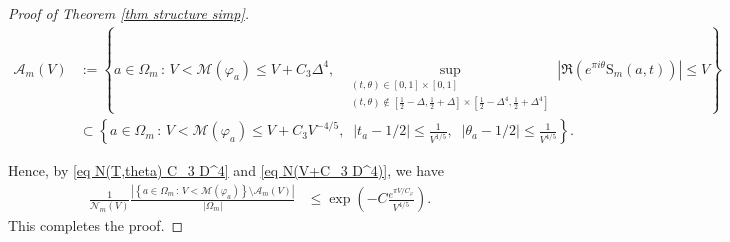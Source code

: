 \documentclass[12pt]{amsart}
\theoremstyle{definition}
\numberwithin{equation}{section}
\numberwithin{equation}{section}
\def\Ncal{\mathcal{N}}
\def\B{\mathrm{S}}
\def\M{\mathcal{M}}
\def\Mp{C_\varphi}
\begin{document}
\begin{proof}[Proof of Theorem \ref{thm structure simp}]
\begin{align*}
\mathcal{A}_m(V)&:= \left\{
a \in \Omega_m \, :\,  
V < \M(\varphi_a)\leq V + C_3\Delta^4, \;\;
\sup_{\substack{(t,\theta) \in 
[0,1]\times [0,1] 
\\
(t,\theta) \not\in 
\left[\frac{1}{2}-\Delta,\frac{1}{2}+\Delta\right]\times \left[\frac{1}{2}-\Delta^4,\frac{1}{2}+\Delta^4\right] }}
\left|\Re\left(e^{\pi i\theta}\B_m(a,t)\right)
\right|\leq V
\right\}\\
&\subset \left\{
a \in \Omega_m \, :\,  
V < \M(\varphi_a)\leq V + C_3 V^{-4/5}, \;\;
| t_a - 1/2|\leq \frac{1}{V^{1/5}}, \;\; | \theta_a - 1/2|\leq \frac{1}{V^{4/5}}
\right\}.
\end{align*}

Hence, by \eqref{eq N(T,theta) C_3 D^4}
and \eqref{eq N(V+C_3 D^4)}, we have
\begin{align*}
\frac{1}{\Ncal_m(V)}\frac{| \left\{
a \in \Omega_m \, :\,  
V < \M(\varphi_a)\right\} 
\setminus \mathcal{A}_m(V)| }{| \Omega_m |}
&\leq  
\exp\left(- C\frac{e^{\pi V/\Mp}}{V^{4/5}}\right) .
\end{align*}
This completes the proof.
\end{proof}
\end{document}
